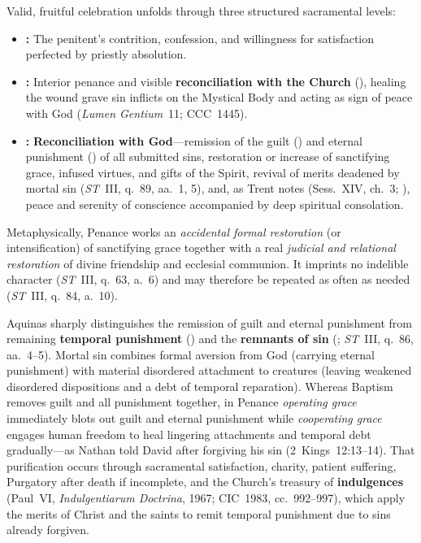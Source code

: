 Valid, fruitful celebration unfolds through three structured sacramental levels:
\begin{itemize}
  \item \textbf{:} The penitent's contrition, confession, and willingness for satisfaction perfected by priestly absolution.
  \item \textbf{:} Interior penance and visible \textbf{reconciliation with the Church} (), healing the wound grave sin inflicts on the Mystical Body and acting as sign of peace with God (\emph{Lumen Gentium}~11; CCC~1445).
  \item \textbf{:} \textbf{Reconciliation with God}---remission of the guilt () and eternal punishment () of all submitted sins, restoration or increase of sanctifying grace, infused virtues, and gifts of the Spirit, revival of merits deadened by mortal sin (\emph{ST}~III, q.~89, aa.~1, 5), and, as Trent notes (Sess.~XIV, ch.~3; ), peace and serenity of conscience accompanied by deep spiritual consolation.
\end{itemize}

Metaphysically, Penance works an \emph{accidental formal restoration} (or intensification) of sanctifying grace together with a real \emph{judicial and relational restoration} of divine friendship and ecclesial communion. It imprints no indelible character (\emph{ST}~III, q.~63, a.~6) and may therefore be repeated as often as needed (\emph{ST}~III, q.~84, a.~10).

Aquinas sharply distinguishes the remission of guilt and eternal punishment from remaining \textbf{temporal punishment} () and the \textbf{remnants of sin} (; \emph{ST}~III, q.~86, aa.~4--5). Mortal sin combines formal aversion from God (carrying eternal punishment) with material disordered attachment to creatures (leaving weakened disordered dispositions and a debt of temporal reparation). Whereas Baptism removes guilt and all punishment together, in Penance \emph{operating grace} immediately blots out guilt and eternal punishment while \emph{cooperating grace} engages human freedom to heal lingering attachments and temporal debt gradually---as Nathan told David after forgiving his sin (2~Kings~12:13--14). That purification occurs through sacramental satisfaction, charity, patient suffering, Purgatory after death if incomplete, and the Church's treasury of \textbf{indulgences} (Paul~VI, \emph{Indulgentiarum Doctrina}, 1967; CIC~1983, cc.~992--997), which apply the merits of Christ and the saints to remit temporal punishment due to sins already forgiven.

